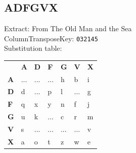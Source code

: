 \documentclass{article}
\begin{document}
\subsection{ADFGVX}
Extract: From The Old Man and the Sea\\
ColumnTransposeKey: \texttt{032145}\\
Substitution table:
\\
\begin{table}[H]
\begin{tabular}{lllllll}
\textbf{} &
  \textbf{A} &
  \textbf{D} &
  \textbf{F} &
  \textbf{G} &
  \textbf{V} &
  \textbf{X} \\ \cline{2-7}
\multicolumn{1}{l|}{\textbf{A}} &
  \multicolumn{1}{l|}{...} &
  \multicolumn{1}{l|}{...} &
  \multicolumn{1}{l|}{...} &
  \multicolumn{1}{l|}{h} &
  \multicolumn{1}{l|}{b} &
  \multicolumn{1}{l|}{i} \\ \cline{2-7}
\multicolumn{1}{l|}{\textbf{D}} &
  \multicolumn{1}{l|}{d} &
  \multicolumn{1}{l|}{...} &
  \multicolumn{1}{l|}{p} &
  \multicolumn{1}{l|}{l} &
  \multicolumn{1}{l|}{...} &
  \multicolumn{1}{l|}{g} \\ \cline{2-7}
\multicolumn{1}{l|}{\textbf{F}} &
  \multicolumn{1}{l|}{q} &
  \multicolumn{1}{l|}{x} &
  \multicolumn{1}{l|}{y} &
  \multicolumn{1}{l|}{n} &
  \multicolumn{1}{l|}{f} &
  \multicolumn{1}{l|}{j} \\ \cline{2-7}
\multicolumn{1}{l|}{\textbf{G}} &
  \multicolumn{1}{l|}{u} &
  \multicolumn{1}{l|}{k} &
  \multicolumn{1}{l|}{...} &
  \multicolumn{1}{l|}{c} &
  \multicolumn{1}{l|}{r} &
  \multicolumn{1}{l|}{m} \\ \cline{2-7}
\multicolumn{1}{l|}{\textbf{V}} &
  \multicolumn{1}{l|}{s} &
  \multicolumn{1}{l|}{...} &
  \multicolumn{1}{l|}{...} &
  \multicolumn{1}{l|}{...} &
  \multicolumn{1}{l|}{...} &
  \multicolumn{1}{l|}{v} \\ \cline{2-7}
\multicolumn{1}{l|}{\textbf{X}} &
  \multicolumn{1}{l|}{a} &
  \multicolumn{1}{l|}{o} &
  \multicolumn{1}{l|}{t} &
  \multicolumn{1}{l|}{z} &
  \multicolumn{1}{l|}{w} &
  \multicolumn{1}{l|}{e} \\ \cline{2-7}
\end{tabular}
\end{table}
\end{document}
